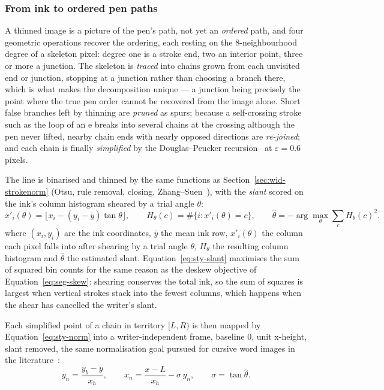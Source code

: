\subsubsection{From ink to ordered pen paths}
\label{sec:sty-trace}

A thinned image is a picture of the pen's path, not yet an \emph{ordered} path, and four geometric operations recover the ordering, each resting on the 8-neighbourhood degree of a skeleton pixel: degree one is a stroke end, two an interior point, three or more a junction. The skeleton is \emph{traced} into chains grown from each unvisited end or junction, stopping at a junction rather than choosing a branch there, which is what makes the decomposition unique --- a junction being precisely the point where the true pen order cannot be recovered from the image alone. Short false branches left by thinning are \emph{pruned} as spurs; because a self-crossing stroke such as the loop of an e breaks into several chains at the crossing although the pen never lifted, nearby chain ends with nearly opposed directions are \emph{re-joined}; and each chain is finally \emph{simplified} by the Douglas--Peucker recursion~\cite{douglas1973} at $\varepsilon=0.6$ pixels.

The line is binarised and thinned by the same functions as Section~\ref{sec:wid-strokenorm} (Otsu, rule removal, closing, Zhang--Suen~\cite{zhang1984}), with the \emph{slant} scored on the ink's column histogram sheared by a trial angle $\theta$:
\begin{equation}
x'_i(\theta)=\bigl\lfloor x_i-(y_i-\bar y)\tan\theta\bigr\rfloor,\qquad H_\theta(c)=\#\{i:x'_i(\theta)=c\},\qquad \hat\theta=-\arg\max_\theta\sum_cH_\theta(c)^2 .
\label{eq:sty-slant}
\end{equation}
where $(x_i,y_i)$ are the ink coordinates, $\bar y$ the mean ink row, $x'_i(\theta)$ the column each pixel falls into after shearing by a trial angle $\theta$, $H_\theta$ the resulting column histogram and $\hat\theta$ the estimated slant. Equation~\ref{eq:sty-slant} maximises the sum of squared bin counts for the same reason as the deskew objective of Equation~\ref{eq:seg-skew}: shearing conserves the total ink, so the sum of squares is largest when vertical strokes stack into the fewest columns, which happens when the shear has cancelled the writer's slant.

Each simplified point of a chain in territory $[L,R)$ is then mapped by Equation~\ref{eq:sty-norm} into a writer-independent frame, baseline 0, unit x-height, slant removed, the same normalisation goal pursued for cursive word images in the literature~\cite{vinciarelli2001}:
\begin{equation}
y_n=\frac{y_b-y}{x_h},\qquad x_n=\frac{x-L}{x_h}-\sigma\,y_n,\qquad\sigma=\tan\hat\theta .
\label{eq:sty-norm}
\end{equation}

